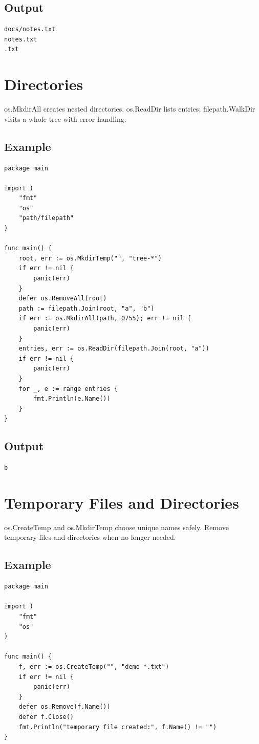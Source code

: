 \documentclass[10pt,oneside]{article}
\newcommand{\sectionline}{\par\vspace{4pt}{\color{rule}\hrule height .5pt}\vspace{7pt}\color{ink}\noindent}
\begin{document}
\subsection*{Output}
\begin{lstlisting}[style=terminal]
docs/notes.txt
notes.txt
.txt
\end{lstlisting}
\clearpage
\section{Directories}
\sectionline
os.MkdirAll creates nested directories. os.ReadDir lists entries; filepath.WalkDir visits a whole tree with error handling.\par
\subsection*{Example}
\begin{lstlisting}[style=gocode]
package main

import (
	"fmt"
	"os"
	"path/filepath"
)

func main() {
	root, err := os.MkdirTemp("", "tree-*")
	if err != nil {
		panic(err)
	}
	defer os.RemoveAll(root)
	path := filepath.Join(root, "a", "b")
	if err := os.MkdirAll(path, 0755); err != nil {
		panic(err)
	}
	entries, err := os.ReadDir(filepath.Join(root, "a"))
	if err != nil {
		panic(err)
	}
	for _, e := range entries {
		fmt.Println(e.Name())
	}
}
\end{lstlisting}
\subsection*{Output}
\begin{lstlisting}[style=terminal]
b
\end{lstlisting}
\clearpage
\section{Temporary Files and Directories}
\sectionline
os.CreateTemp and os.MkdirTemp choose unique names safely. Remove temporary files and directories when no longer needed.\par
\subsection*{Example}
\begin{lstlisting}[style=gocode]
package main

import (
	"fmt"
	"os"
)

func main() {
	f, err := os.CreateTemp("", "demo-*.txt")
	if err != nil {
		panic(err)
	}
	defer os.Remove(f.Name())
	defer f.Close()
	fmt.Println("temporary file created:", f.Name() != "")
}
\end{lstlisting}
\end{document}

